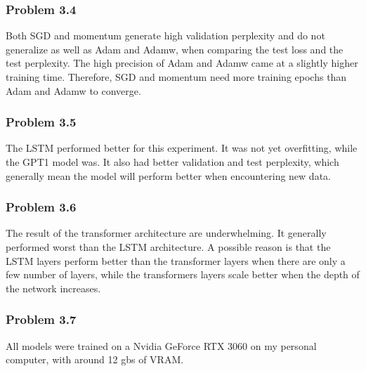 \documentclass[12pt]{article}
\theoremstyle{definition}
\begin{document}
\subsubsection*{Problem 3.4}
Both SGD and momentum generate high validation perplexity and do not generalize
as well as Adam and Adamw, when comparing the test loss and the test perplexity.
The high precision of Adam and Adamw came at a slightly higher training time.
Therefore, SGD and momentum need more training epochs than Adam and Adamw to
converge.
\subsubsection*{Problem 3.5}
The LSTM performed better for this experiment. It was not yet overfitting, while
the GPT1 model was.  It also had better validation and test perplexity, which
generally mean the model will perform better when encountering new data.
\subsubsection*{Problem 3.6}
The result of the transformer architecture are underwhelming. It generally
performed worst than the LSTM architecture. A possible reason is that the LSTM
layers perform better than the transformer layers when there are only a few
number of layers, while the transformers layers scale better when the depth of
the network increases.
\subsubsection*{Problem 3.7}
All models were trained on a Nvidia GeForce RTX 3060 on my personal computer,
with around 12 gbs of VRAM.
\end{document}
